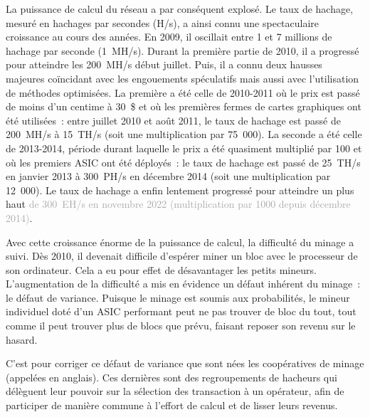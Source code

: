 La puissance de calcul du réseau a par conséquent explosé. Le taux de hachage, mesuré en hachages par secondes (H/s), a ainsi connu une spectaculaire croissance au cours des années. En 2009, il oscillait entre 1 et 7 millions de hachage par seconde (1~MH/s). Durant la première partie de 2010, il a progressé pour atteindre les 200~MH/s début juillet. Puis, il a connu deux hausses majeures coïncidant avec les engouements spéculatifs mais aussi avec l'utilisation de méthodes optimisées. La première a été celle de 2010-2011 où le prix est passé de moins d'un centime à 30~\$ et où les premières fermes de cartes graphiques ont été utilisées~: entre juillet 2010 et août 2011, le taux de hachage est passé de 200~MH/s à 15~TH/s (soit une multiplication par 75~000). La seconde a été celle de 2013-2014, période durant laquelle le prix a été quasiment multiplié par 100 et où les premiers ASIC ont été déployés~: le taux de hachage est passé de 25~TH/s en janvier 2013 à 300~PH/s en décembre 2014 (soit une multiplication par 12~000). Le taux de hachage a enfin lentement progressé pour atteindre un plus haut \textcolor{darkgray}{de 300~EH/s en novembre 2022 (multiplication par 1000 depuis décembre 2014)}.


Avec cette croissance énorme de la puissance de calcul, la difficulté du minage a suivi. Dès 2010, il devenait difficile d'espérer miner un bloc avec le processeur de son ordinateur. Cela a eu pour effet de désavantager les petits mineurs. L'augmentation de la difficulté a mis en évidence un défaut inhérent du minage~: le défaut de variance. Puisque le minage est soumis aux probabilités, le mineur individuel doté d'un ASIC performant peut ne pas trouver de bloc du tout, tout comme il peut trouver plus de blocs que prévu, faisant reposer son revenu sur le hasard.

C'est pour corriger ce défaut de variance que sont nées les coopératives de minage (appelées  en anglais). Ces dernières sont des regroupements de hacheurs qui délèguent leur pouvoir sur la sélection des transaction à un opérateur, afin de participer de manière commune à l'effort de calcul et de lisser leurs revenus.

